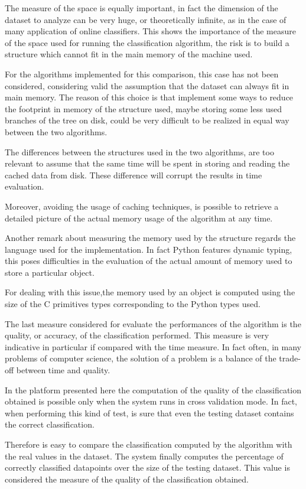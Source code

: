 \documentclass{acm_proc_article-sp-sigmod07}
\begin{document}
The measure of the space is equally important, in fact the dimension of
the dataset to analyze can be very huge, or theoretically infinite, as in
the case of many application of online classifiers.
This shows the importance of the measure of the space used for running the
classification algorithm, the risk is to build a structure which cannot
fit in the main memory of the machine used.

For the algorithms implemented for this comparison, this case has not been
considered, considering valid the assumption that the dataset can always
fit in main memory.
The reason of this choice is that implement some ways to reduce the
footprint in memory of the structure used, maybe storing some less used
branches of the tree on disk, could be very difficult to be realized in
equal way between the two algorithms.

The differences between the structures used in the two algorithms, are too
relevant to assume that the same time will be spent in storing and reading
the cached data from disk. These difference will corrupt the results in
time evaluation.

Moreover, avoiding the usage of caching techniques, is possible to
retrieve a detailed picture of the actual memory usage of the algorithm at
any time. 

Another remark about measuring the memory used by the structure regards
the language used for the implementation.
In fact Python features dynamic typing, this poses difficulties in the
evaluation of the actual amount of memory used to store a
particular object.

For dealing with this issue,the memory used by an object is computed using
the size of the C primitives types corresponding to the Python types used.

The last measure considered for evaluate the performances of the
algorithm is the quality, or accuracy, of the classification performed. 
This measure is very indicative in particular if compared with the time
measure.
In fact often, in many problems of computer science, the solution of a
problem is a balance of the trade-off between time and quality.

In the platform presented here the computation of the quality of the
classification obtained is possible only when the system runs in cross
validation mode. In fact, when performing this kind of test, is sure that
even the testing dataset contains the correct classification.

Therefore is easy to compare the classification computed by the algorithm
with the real values in the dataset.
The system finally computes the percentage of correctly classified
datapoints over the size of the testing dataset.
This value is considered the measure of the quality of the classification
obtained.
\end{document}
